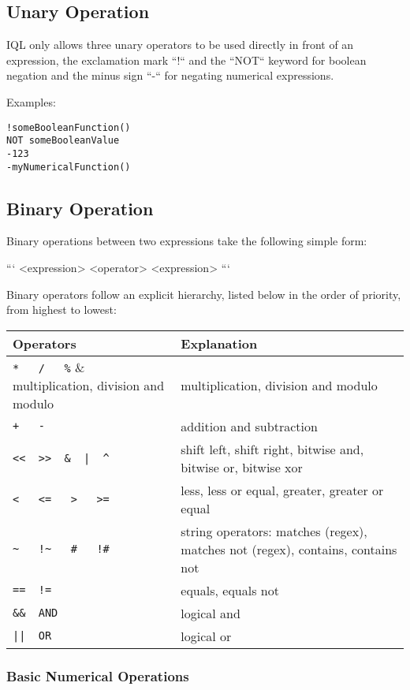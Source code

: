 \documentclass[11pt]{article}
\begin{document}
\subsection{Unary Operation}
\label{sec:unary-operation}

IQL only allows three unary operators to be used directly in front of an expression, the exclamation mark ``!`` and the ``NOT`` keyword for boolean negation and the minus sign ``-`` for negating numerical expressions.

Examples:

\begin{verbatim}
!someBooleanFunction()
NOT someBooleanValue
-123
-myNumericalFunction()
\end{verbatim}

\subsection{Binary Operation}
\label{sec:binary-operation}

Binary operations between two expressions take the following simple form:

```
<expression> <operator> <expression>
```

Binary operators follow an explicit hierarchy, listed below in the order of priority, from highest to lowest:

\begin{tabular}{|p{}|p{}|}
	\hline 
Operators	& Explanation \\ 
	\hline 
	\hline
\verb|*   /   %|	& multiplication, division and modulo \\ 
	\hline 
\verb|+   -|	& addition and subtraction \\ 
	\hline 
\verb#<<  >>  &  |  ^#	& shift left, shift right, bitwise and, bitwise or, bitwise xor \\ 
	\hline 
\verb|<   <=   >   >=|	& less, less or equal, greater, greater or equal \\ 
	\hline 
\verb|~   !~   #   !#|	& string operators: matches (regex), matches not (regex), contains, contains not \\ 
	\hline 
\verb|==  !=|	& equals, equals not \\ 
	\hline 
\verb|&&  AND|	& logical and \\ 
	\hline 
\verb#||  OR#	& logical or \\ 
	\hline 
\end{tabular} 

\subsubsection{Basic Numerical Operations}
\label{sec:basic-numerical-operations}
\end{document}
